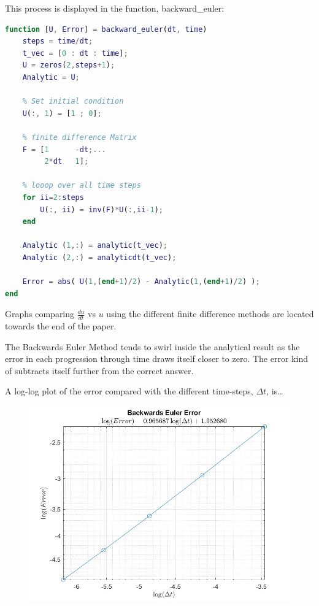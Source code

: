 \documentclass[12pt,letterpaper]{article}
\begin{document}
\begin{enumerate}
This process is displayed in the function, backward\_euler:
\begin{lstlisting}[language = Matlab]
function [U, Error] = backward_euler(dt, time)
    steps = time/dt;
    t_vec = [0 : dt : time]; 
    U = zeros(2,steps+1);
    Analytic = U;
    
    % Set initial condition
    U(:, 1) = [1 ; 0];
    
    % finite difference Matrix
    F = [1      -dt;...
         2*dt   1];
    
    % looop over all time steps
    for ii=2:steps
        U(:, ii) = inv(F)*U(:,ii-1);
    end
    
    Analytic (1,:) = analytic(t_vec);
    Analytic (2,:) = analyticdt(t_vec);

    Error = abs( U(1,(end+1)/2) - Analytic(1,(end+1)/2) ); 
end
\end{lstlisting}

Graphs comparing $\frac{du}{dt}$ vs $u$ using the different finite difference methods are located towards the end of the paper.

The Backwards Euler Method tends to swirl inside the analytical result as the error in each progression through time draws itself closer to zero. The error kind of subtracts itself further from the correct answer.


\newpage
A log-log plot of the error compared with the different time-steps, $\Delta t$, is\ldots

\begin{figure}[!h]
    \centering
    \includegraphics[width = 1\linewidth]{backward_error.jpg}
\end{figure}


\end{enumerate}
\end{document}
